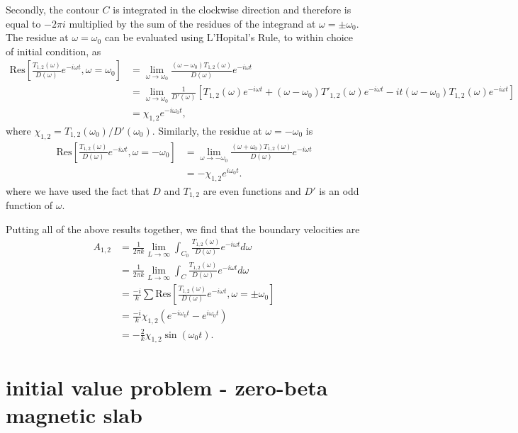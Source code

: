 \documentclass{aastex61}
\begin{document}
Secondly, the contour $C$ is integrated in the clockwise direction and therefore is equal to $-2\pi i$ multiplied by the sum of the residues of the integrand at $\omega = \pm \omega_0$. The residue at $\omega = \omega_0$ can be evaluated using L'Hopital's Rule, to within choice of initial condition, as
\begin{align}
\mathrm{Res}\left[\frac{T_{1,2}(\omega)}{D(\omega)}e^{-i\omega t}, \omega = \omega_0 \right] &= 
\lim_{\omega \to \omega_0} \frac{(\omega - \omega_0)T_{1,2}(\omega)}{D(\omega)} e^{-i\omega t} \\ 
&= \lim_{\omega \to \omega_0} \frac{1}{D'(\omega)} [T_{1,2}(\omega)e^{-i\omega t} + (\omega - \omega_0)T'_{1,2}(\omega)e^{-i\omega t} - it(\omega - \omega_0)T_{1,2}(\omega)e^{-i\omega t}] \\
&= \chi_{1,2} e^{-i\omega_0 t},
\end{align}
where $\chi_{1,2} = T_{1,2}(\omega_0) / D'(\omega_0)$.
Similarly, the residue at $\omega = -\omega_0$ is
\begin{align}
\mathrm{Res}\left[\frac{T_{1,2}(\omega)}{D(\omega)}e^{-i\omega t}, \omega = -\omega_0 \right] &= \lim_{\omega \to -\omega_0} \frac{(\omega + \omega_0)T_{1,2}(\omega)}{D(\omega)} e^{-i\omega t} \\
&= -\chi_{1,2} e^{i\omega_0 t}.
\end{align}
where we have used the fact that $D$ and $T_{1,2}$ are even functions and $D'$ is an odd function of $\omega$.

Putting all of the above results together, we find that the boundary velocities are
\begin{align}
A_{1,2} &= \frac{1}{2\pi k} \lim_{L \to \infty} \int_{C_0} \frac{T_{1,2}(\omega)}{D(\omega)} e^{-i\omega t} d\omega \\
&= \frac{1}{2\pi k} \lim_{L \to \infty} \int_{C} \frac{T_{1,2}(\omega)}{D(\omega)} e^{-i\omega t} d\omega \\
&= \frac{-i}{k} \sum \mathrm{Res}\left[\frac{T_{1,2}(\omega)}{D(\omega)}e^{-i\omega t}, \omega = \pm \omega_0 \right] \\
&= \frac{-i}{k} \chi_{1,2} (e^{-i\omega_0 t} - e^{i\omega_0 t}) \\
&= -\frac{2}{k} \chi_{1,2} \sin(\omega_0 t).
\end{align}




\section{initial value problem - zero-beta magnetic slab}
\end{document}
